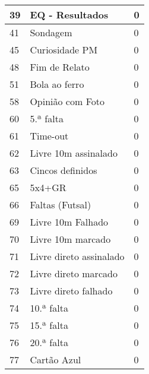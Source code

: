 \begin{longtable}{| p{} | p{} | p{} |}
    39 & EQ - Resultados & 0 \\ \hline
    41 & Sondagem & 0 \\ \hline
    45 & Curiosidade PM & 0 \\ \hline
    48 & Fim de Relato & 0 \\ \hline
    51 & Bola ao ferro & 0 \\ \hline
    58 & Opinião com Foto & 0 \\ \hline
    60 & 5.ª falta & 0 \\ \hline
    61 & Time-out & 0 \\ \hline
    62 & Livre 10m assinalado & 0 \\ \hline
    63 & Cincos definidos & 0 \\ \hline
    65 & 5x4+GR & 0 \\ \hline
    66 & Faltas (Futsal) & 0 \\ \hline
    69 & Livre 10m Falhado & 0 \\ \hline
    70 & Livre 10m marcado & 0 \\ \hline
    71 & Livre direto assinalado & 0 \\ \hline 
    72 & Livre direto marcado & 0 \\ \hline
    73 & Livre direto falhado & 0 \\ \hline
    74 & 10.ª falta & 0 \\ \hline
    75 & 15.ª falta & 0 \\ \hline
    76 & 20.ª falta & 0 \\ \hline
    77 & Cartão Azul & 0 \\ \hline
\end{longtable}
